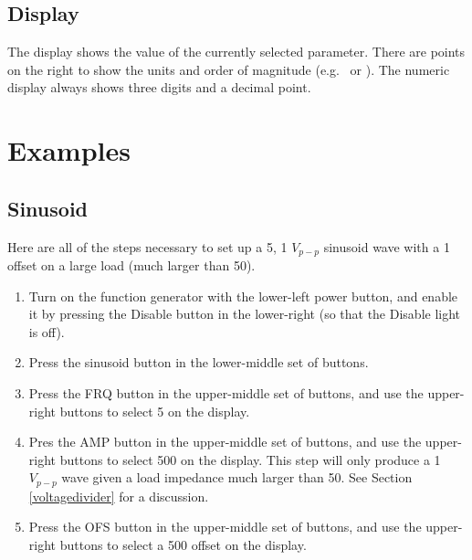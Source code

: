 \documentclass{article}
\begin{document}
\subsection{Display}
The display shows the value of the currently selected parameter. There are points on the right to show the units and order of magnitude (e.g. \milli\volt\ or \volt). The numeric display always shows three digits and a decimal point.

\section{Examples}

\subsection{Sinusoid}
Here are all of the steps necessary to set up a \unit{5}{\kilo\hertz}, \unit{1}{\volt} $V_{p-p}$ sinusoid wave with a \unit{1}{\volt} offset on a large load (much larger than \unit{50}{\ohm}).
\begin{enumerate}
\item Turn on the function generator with the lower-left power button, and enable it by pressing the Disable button in the lower-right (so that the Disable light is off).
\item Press the sinusoid button in the lower-middle set of buttons.
\item Press the FRQ button in the upper-middle set of buttons, and use the upper-right buttons to select \unit{5}{\kilo\hertz} on the display.
\item Pres the AMP button in the upper-middle set of buttons, and use the upper-right buttons to select \unit{500}{\milli\volt} on the display. This step will only produce a \unit{1}{\volt} $V_{p-p}$ wave given a load impedance much larger than \unit{50}{\ohm}. See Section \ref{voltagedivider} for a discussion.
\item Press the OFS button in the upper-middle set of buttons, and use the upper-right buttons to select a \unit{500}{\milli\volt} offset on the display. 
\end{enumerate}
\end{document}
